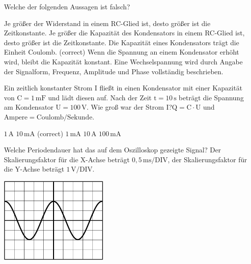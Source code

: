 \documentclass[11pt]{exam}
\begin{document}
\setlength{\voffset}{-0.5in}
\setlength{\headsep}{5pt}

\hspace{2mm}
 \hspace{5mm}
\vspace{4mm}

\begin{questions}

\question Welche der folgenden Aussagen ist falsch?

\begin{choices}
	\choice Je größer der Widerstand in einem RC-Glied ist, desto größer ist die Zeitkonstante.
	\choice Je größer die Kapazität des Kondensators in einem RC-Glied ist, desto größer ist die Zeitkonstante.
	\choice Die Kapazität eines Kondensators trägt die Einheit Coulomb. (correct)
	\choice Wenn die Spannung an einem Kondensator erhöht wird, bleibt die Kapazität konstant.
	\choice Eine Wechselspannung wird durch Angabe der Signalform, Frequenz, Amplitude und Phase vollständig beschrieben.
\end{choices}

\vspace{3mm}\question Ein zeitlich konstanter Strom \(\mathrm{I}\) fließt in einen Kondensator mit einer Kapazität von \(\mathrm{C=1\,mF}\) und lädt diesen auf. Nach der Zeit \(\mathrm{t=10\,s}\) beträgt die Spannung am Kondensator \(\mathrm{U=100\,V}\). Wie groß war der Strom \(\mathrm{I}\)?\(\mathrm{Q=C \cdot U}\) und \(\mathrm{Ampere=Coulomb/Sekunde}\).

\begin{choices}
	\choice \(\mathrm{1\,A}\)
	\choice \(\mathrm{10\,mA}\) (correct)
	\choice \(\mathrm{1\,mA}\)
	\choice \(\mathrm{10\,A}\)
	\choice \(\mathrm{100\,mA}\)
\end{choices}

\vspace{3mm}\question Welche Periodendauer hat das auf dem Oszilloskop gezeigte Signal? Der Skalierungsfaktor für die X-Achse beträgt \(\mathrm{0,5\,ms/DIV}\), der Skalierungsfaktor für die Y-Achse beträgt \(\mathrm{1\,V/DIV}\). 

\includegraphics[width=0.4\textwidth]{images/Oszi2.png}


\end{questions}
\end{document}
